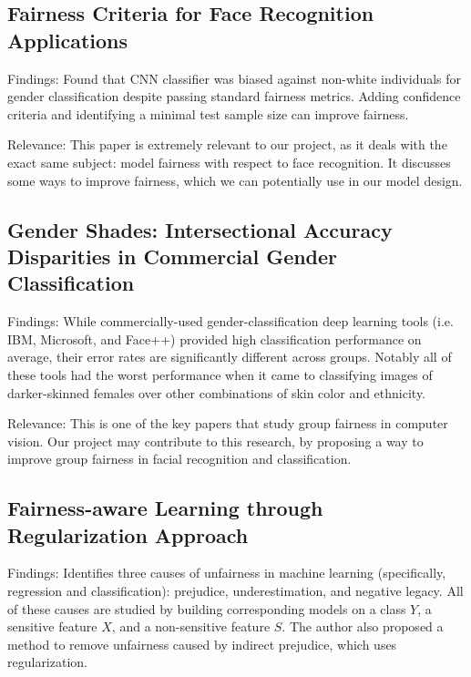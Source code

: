 \subsection{Fairness Criteria for Face Recognition Applications \cite{michalsky2019fair}}

Findings: Found that CNN classifier was biased against non-white individuals for gender classification despite passing standard fairness metrics. Adding confidence criteria and identifying a minimal test sample size can improve fairness.

\noindent Relevance: This paper is extremely relevant to our project, as it deals with the exact same subject: model fairness with respect to face recognition. It discusses some ways to improve fairness, which we can potentially use in our model design.

\subsection{Gender Shades: Intersectional Accuracy Disparities in Commercial Gender Classification \cite{buolamwini2018gendershades}}

Findings: While commercially-used gender-classification deep learning tools (i.e. IBM, Microsoft, and Face++) provided high classification performance on average, their error rates are significantly different across groups.  Notably all of these tools had the worst performance when it came to classifying images of darker-skinned females over other combinations of skin color and ethnicity.


\noindent Relevance: This is one of the key papers that study group fairness in computer vision. Our project may contribute to this research, by proposing a way to improve group fairness in facial recognition and classification.


\subsection{Fairness-aware Learning through Regularization Approach \cite{6137441}}
Findings: Identifies three causes of unfairness in machine learning (specifically, regression and classification): prejudice, underestimation, and negative legacy. All of these causes are studied by building corresponding models on a class $Y$, a sensitive feature $X$, and a non-sensitive feature $S$. The author also proposed a method to remove unfairness caused by indirect prejudice, which uses regularization.


